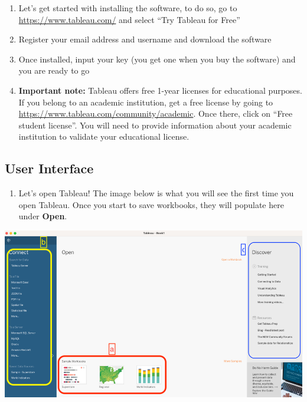 \documentclass[
]{book}
\providecommand{\tightlist}{%
  \setlength{\itemsep}{0pt}\setlength{\parskip}{0pt}}
\begin{document}
\begin{enumerate}
\def\labelenumi{\arabic{enumi}.}
\item
  Let's get started with installing the software, to do so, go to
  \url{https://www.tableau.com/} and select ``Try Tableau for Free''
\item
  Register your email address and username and download the software
\item
  Once installed, input your key (you get one when you buy the software) and you are ready to go
\item
  \textbf{Important note:} Tableau offers free 1-year licenses for educational purposes. If you belong to an academic institution, get a free license by going to \url{https://www.tableau.com/community/academic}. Once there, click on ``Free student license''. You will need to provide information about your academic institution to validate your educational license.
\end{enumerate}

\hypertarget{user-interface}{%
\subsection{User Interface}\label{user-interface}}

\begin{enumerate}
\def\labelenumi{\arabic{enumi}.}
\tightlist
\item
  Let's open Tableau! The image below is what you will see the first time you open Tableau. Once you start to save workbooks, they will populate here under \textbf{Open}.
\end{enumerate}

\includegraphics{images/M3S1_image0_User_Interface.png}
\end{document}
